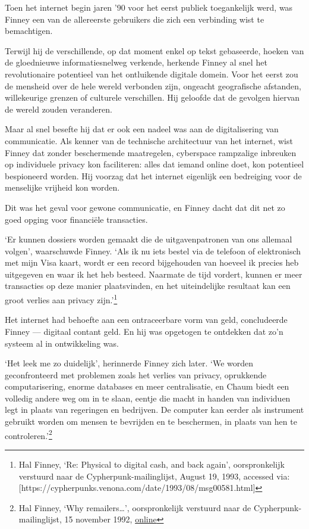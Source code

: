 \documentclass[
  a5paper,
  smalldemyvopaper,11pt,twoside,onecolumn,openright,extrafontsizes]{memoir}
\begin{document}
Toen het internet begin jaren '90 voor het eerst publiek toegankelijk
werd, was Finney een van de allereerste gebruikers die zich een
verbinding wist te bemachtigen.

Terwijl hij de verschillende, op dat moment enkel op tekst gebaseerde,
hoeken van de gloednieuwe informatiesnelweg verkende, herkende Finney al
snel het revolutionaire potentieel van het ontluikende digitale domein.
Voor het eerst zou de mensheid over de hele wereld verbonden zijn,
ongeacht geografische afstanden, willekeurige grenzen of culturele
verschillen. Hij geloofde dat de gevolgen hiervan de wereld zouden
veranderen.

Maar al snel besefte hij dat er ook een nadeel was aan de digitalisering
van communicatie. Als kenner van de technische architectuur van het
internet, wist Finney dat zonder beschermende maatregelen, cyberspace
rampzalige inbreuken op individuele privacy kon faciliteren: alles dat
iemand online doet, kon potentieel bespioneerd worden. Hij voorzag dat
het internet eigenlijk een bedreiging voor de menselijke vrijheid kon
worden.

Dit was het geval voor gewone communicatie, en Finney dacht dat dit net
zo goed opging voor financiële transacties.

`Er kunnen dossiers worden gemaakt die de uitgavenpatronen van ons
allemaal volgen', waarschuwde Finney. `Als ik nu iets bestel via de
telefoon of elektronisch met mijn Visa kaart, wordt er een record
bijgehouden van hoeveel ik precies heb uitgegeven en waar ik het heb
besteed. Naarmate de tijd vordert, kunnen er meer transacties op deze
manier plaatsvinden, en het uiteindelijke resultaat kan een groot
verlies aan privacy zijn.'\footnote{Hal Finney, `Re: Physical to digital
  cash, and back again', oorspronkelijk verstuurd naar de
  Cypherpunk-mailinglijst, August 19, 1993, accessed via:
  {[}https://cypherpunks.venona.com/date/1993/08/msg00581.html{]}}

Het internet had behoefte aan een ontraceerbare vorm van geld,
concludeerde Finney --- digitaal contant geld. En hij was opgetogen te
ontdekken dat zo'n systeem al in ontwikkeling was.

`Het leek me zo duidelijk', herinnerde Finney zich later. `We worden
geconfronteerd met problemen zoals het verlies van privacy, oprukkende
computarisering, enorme databases en meer centralisatie, en Chaum biedt
een volledig andere weg om in te slaan, eentje die macht in handen van
individuen legt in plaats van regeringen en bedrijven. De computer kan
eerder als instrument gebruikt worden om mensen te bevrijden en te
beschermen, in plaats van hen te controleren.'\footnote{Hal Finney, `Why
  remailers\ldots{}', oorspronkelijk verstuurd naar de
  Cypherpunk-mailinglijst, 15 november 1992,
  \href{https://cypherpunks.venona.com/date/1993/08/msg00581.html}{online}}
\end{document}
